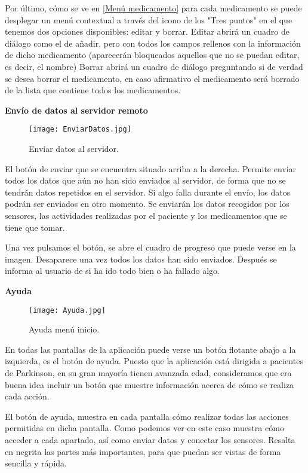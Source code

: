\documentclass[11pt,spanish]{article}
\begin{document}
Por último, cómo se ve en \ref{Menú medicamento} para cada medicamento se puede desplegar un menú contextual a través del icono de los "Tres puntos" en el que tenemos dos opciones disponibles: editar y borrar. Editar abrirá un cuadro de diálogo como el de añadir, pero con todos los campos rellenos con la información de dicho medicamento (aparecerán bloqueados aquellos que no se puedan editar, es decir, el nombre) Borrar abrirá un cuadro de diálogo preguntando si de verdad se desea borrar el medicamento, en caso afirmativo el medicamento será borrado de la lista que contiene todos los medicamentos.
\newline

{\bf Envío de datos al servidor remoto}
\newline
\begin{figure}[!htb]
\centering
\texttt{[image: EnviarDatos.jpg]}
\caption{Enviar datos al servidor.}
\end{figure}

El botón de enviar que se encuentra situado arriba a la derecha. Permite enviar todos los datos que aún no han sido enviados al servidor, de forma que no se tendrán datos repetidos en el servidor. Si algo falla durante el envío, los datos podrán ser enviados en otro momento. Se enviarán los datos recogidos por los sensores, las actividades realizadas por el paciente y los medicamentos que se tiene que tomar.
\newline

Una vez pulsamos el botón, se abre el cuadro de progreso que puede verse en la imagen. Desaparece una vez todos los datos han sido enviados. Después se informa al usuario de si ha ido todo bien o ha fallado algo.
\newline
\newpage

{\bf Ayuda}
\begin{figure}[h!]
\centering
\texttt{[image: Ayuda.jpg]}
\caption{Ayuda menú inicio.}
\end{figure}

En todas las pantallas de la aplicación puede verse un botón flotante abajo a la izquierda, es el botón de ayuda. Puesto que la aplicación está dirigida a pacientes de Parkinson, en su gran mayoría tienen avanzada edad, consideramos que era buena idea incluir un botón que muestre información acerca de cómo se realiza cada acción.
\newline

El botón de ayuda, muestra en cada pantalla cómo realizar todas las acciones permitidas en dicha pantalla. Como podemos ver en este caso muestra cómo acceder a cada apartado, así como enviar datos y conectar los sensores. Resalta en negrita las partes más importantes, para que puedan ser vistas de forma sencilla y rápida.
\newpage
\end{document}
